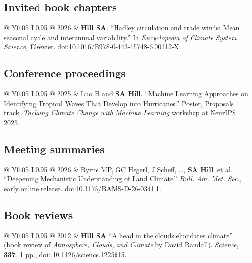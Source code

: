 \documentclass[letterpaper,11pt]{shillcv}
\begin{document}
\subsection*{Invited book chapters}
\begin{longtable}{@{}  Y{0.05\textwidth} L{0.95\textwidth} @{}}
2026 & \textbf{Hill SA}.  ``Hadley circulation and trade winds: Mean seasonal cycle and interannual variability.''  In \emph{Encyclopedia of Climate System Science}, Elsevier.  doi:\href{https://doi.org/10.1016/B978-0-443-15748-6.00112-X}{10.1016/B978-0-443-15748-6.00112-X}.\\
\end{longtable}

\subsection*{Conference proceedings}
\begin{longtable}{@{}  Y{0.05\textwidth} L{0.95\textwidth} @{}}
2025 & Luo H and \textbf{SA Hill}.  ``Machine Learning Approaches on Identifying Tropical Waves That Develop into Hurricanes.''  Poster, Proposals track, \emph{Tackling Climate Change with Machine Learning} workshop at NeurIPS 2025.\\
\end{longtable}

\subsection*{Meeting summaries}
\begin{longtable}{@{}  Y{0.05\textwidth} L{0.95\textwidth} @{}}
2026 & Byrne MP, GC Hegerl, J Scheff, \ldots, \textbf{SA Hill}, et al.  ``Deepening Mechanistic Understanding of Land Climate.''  \emph{Bull. Am. Met. Soc.}, early online release.  doi:\href{https://doi.org/10.1175/BAMS-D-26-0341.1}{10.1175/BAMS-D-26-0341.1}.\\
\end{longtable}

\subsection*{Book reviews}
\begin{longtable}{@{}  Y{0.05\textwidth} L{0.95\textwidth} @{}}
2012 & \textbf{Hill SA}  ``A head in the clouds elucidates climate'' (book
review of \emph{Atmosphere, Clouds, and Climate} by David Randall).  \emph{Science}, \textbf{337},
1 pp., doi: \href{http://dx.doi.org/10.1126/science.1225615}{10.1126/science.1225615}.\\
\end{longtable}
\end{document}
